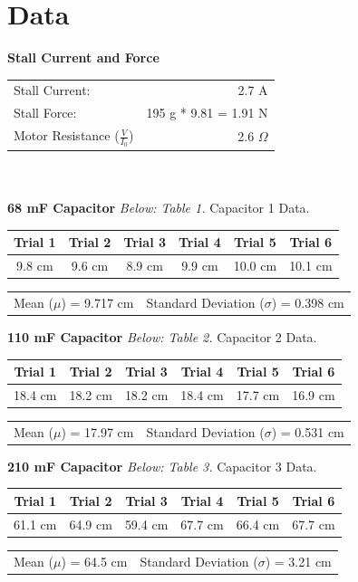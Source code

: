\documentclass[12pt,letterpaper]{article}
\begin{document}
\section{Data}
\textbf{Stall Current and Force}\\
\begin{tabular}{l r}
Stall Current: & 2.7 A\\
Stall Force: & 195 g * 9.81 = 1.91 N\\
Motor Resistance ($\frac{V}{I_0}$) & 2.6 $\Omega$\\
\end{tabular}
\\\\\textbf{68 mF Capacitor}
\newline
\textit{Below: Table 1.} Capacitor 1 Data.
\begin{center}
\begin{tabular}{|c|c|c|c|c|c|}
\hline 
Trial 1 & Trial 2 & Trial 3 & Trial 4 & Trial 5 & Trial 6 \\ 
\hline 
9.8 cm & 9.6 cm & 8.9 cm & 9.9 cm & 10.0 cm & 10.1 cm \\ 
\hline 
\end{tabular} 
\begin{tabular}{l r}
Mean ($\mu$) = 9.717 cm & Standard Deviation ($\sigma$) = 0.398 cm
\end{tabular}

\end{center}
\textbf{110 mF Capacitor} 
\newline
\textit{Below: Table 2.} Capacitor 2 Data.
\begin{center}
\begin{tabular}{|c|c|c|c|c|c|}
\hline 
Trial 1 & Trial 2 & Trial 3 & Trial 4 & Trial 5 & Trial 6 \\ 
\hline 
18.4 cm & 18.2 cm & 18.2 cm & 18.4 cm & 17.7 cm & 16.9 cm \\ 
\hline 
\end{tabular} 
\begin{tabular}{l r}
Mean ($\mu$) = 17.97 cm & Standard Deviation ($\sigma$) = 0.531 cm
\end{tabular}

\end{center}
\textbf{210 mF Capacitor}
\newline
\textit{Below: Table 3.} Capacitor 3 Data.
\begin{center}
\begin{tabular}{|c|c|c|c|c|c|}
\hline 
Trial 1 & Trial 2 & Trial 3 & Trial 4 & Trial 5 & Trial 6 \\ 
\hline 
61.1 cm & 64.9 cm & 59.4 cm & 67.7 cm & 66.4 cm & 67.7 cm \\ 
\hline 
\end{tabular} 
\begin{tabular}{l r}
Mean ($\mu$) = 64.5 cm & Standard Deviation ($\sigma$) = 3.21 cm
\end{tabular}

\end{center}
\end{document}
